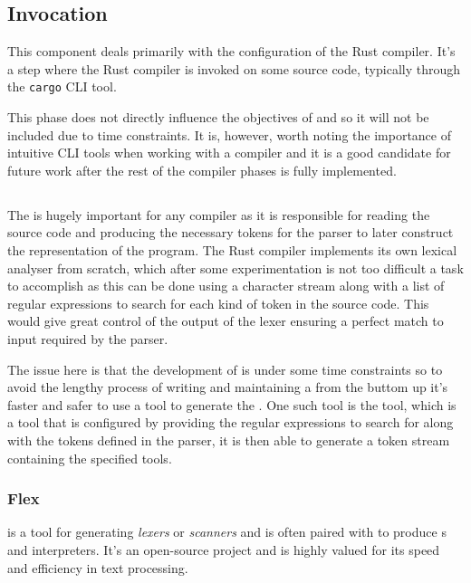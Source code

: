 \subsection{Invocation}

This component deals primarily with the configuration of the Rust compiler. It's a
step where the Rust compiler is invoked on some source code, typically through the
\texttt{cargo} CLI tool\cite{RUST-COMPILER}. 

This phase does not directly influence the objectives of \lang{} and so it will not
be included due to time constraints. It is, however, worth noting the importance of
intuitive CLI tools when working with a compiler and it is a good candidate for
future work after the rest of the compiler phases is fully implemented.

\subsection{\lexer{}}

The \lexer{} is hugely important for any compiler as it is responsible for
reading the source code and producing the necessary tokens for the parser to later
construct the \ast{} representation of the program. The Rust compiler implements its
own lexical analyser from scratch, which after some experimentation is not too
difficult a task to accomplish as this can be done using a character stream along
with a list of regular expressions to search for each kind of token in the source
code. This would give great control of the output of the lexer ensuring a perfect
match to input required by the parser. 

The issue here is that the development of \lang{} is under some time constraints so
to avoid the lengthy process of writing and maintaining a \lexer{} from the buttom up
it's faster and safer to use a tool to generate the \lexer{}. One such tool is the
\lexerGen{} tool, which is a tool that is configured by providing the regular
expressions to search for along with the tokens defined in the parser, it is then
able to generate a token stream containing the specified tools. 

\subsubsection{Flex}

\lexerGen{} is a tool for generating \textit{lexers} or \textit{scanners} and is
often paired with \parserGen{} to produce \parser{}s and interpreters. It's an
open-source project and is highly valued for its speed and efficiency in text
processing. \\

